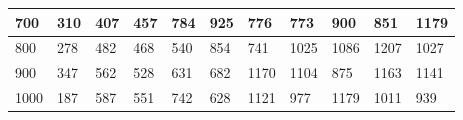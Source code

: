 \documentclass[10pt,letterpaper]{article}
\begin{document}
\begin{center}
\begin{table}
\begin{tabular} { |m{0.5cm}|m{1.3cm}|m{1.3cm}|m{1.3cm}|m{1.3cm}|m{1.3cm}|m{1.3cm}|m{1.3cm}|m{1.3cm}|m{1.3cm}|m{1.3cm}|}
\hline
\cellcolor{Gray}700 & \Large 310 & \Large 407 & \Large 457 & \Large 784 & \Large 925 & \Large 776 & \Large 773 & \Large 900 & \Large 851 & \Large 1179 \\
\hline
\cellcolor{Gray}800 & \Large 278 & \Large 482 & \Large 468 & \Large 540 & \Large 854 & \Large 741 & \Large 1025 & \Large 1086 & \Large 1207 & \Large 1027 \\
\hline
\cellcolor{Gray}900 & \Large 347 & \Large 562 & \Large 528 & \Large 631 & \Large 682 & \Large 1170 & \Large 1104 & \Large 875 & \Large 1163 & \Large 1141 \\
\hline
\cellcolor{Gray}1000 & \Large 187 & \Large 587 & \Large 551 & \Large 742 & \Large 628 & \Large 1121 & \Large 977 & \Large 1179 & \Large 1011 & \Large 939 \\
\hline
\end{tabular} \\
\end{table}
\end{center}
\newpage 
{}
\end{document}
